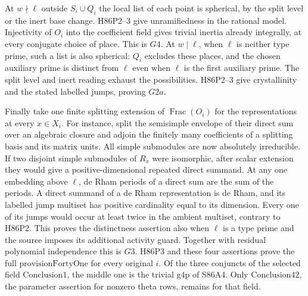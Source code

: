 At $w\nmid\ell$ outside $S_i\cup Q_i$ the local list of each
point is spherical, by the split level or the inert base change.
H86P2--3 give unramifiedness in the rational model. Injectivity
of $O_i$ into the coefficient field gives trivial inertia already
integrally, at every conjugate choice of place. This is $G4$.
At $w\mid\ell$, when $\ell$ is neither type prime, such a list is
also spherical: $Q_i$ excludes these places, and the chosen
auxiliary prime is distinct from $\ell$ even when $\ell$ is the
first auxiliary prime. The split level and inert reading exhaust
the possibilities. H86P2--3 give crystallinity and the stated
labelled jumps, proving $G2a$.

Finally take one finite splitting extension of $\operatorname{Frac}(O_i)$
for the representations at every $x\in X_i$. For instance, split the
semisimple envelope of their direct sum over an algebraic closure and
adjoin the finitely many coefficients of a splitting basis and its
matrix units. All simple submodules are now absolutely irreducible.
If two disjoint simple submodules of $R_x$ were isomorphic, after
scalar extension they would give a positive-dimensional repeated
direct summand. At any one embedding above $\ell$, de Rham periods
of a direct sum are the sum of the periods. A direct summand of a
de Rham representation is de Rham, and its labelled jump multiset
has positive cardinality equal to its dimension. Every one of its
jumps would occur at least twice in the ambient multiset, contrary
to H86P2. This proves the distinctness assertion also when $\ell$ is
a type prime and the source imposes its additional activity guard.
Together with residual polynomial independence this is $G3$.
H86P3 and these four assertions prove the full
$\mathrm{provisionFortyOne}$ for every original $i$.
Of the three conjuncts of the selected field $\mathrm{Conclusion1}$,
the middle one is the trivial $\mathrm{g4p}$ of S86A4. Only
$\mathrm{Conclusion42}$, the parameter assertion for nonzero
theta rows, remains for that field.
